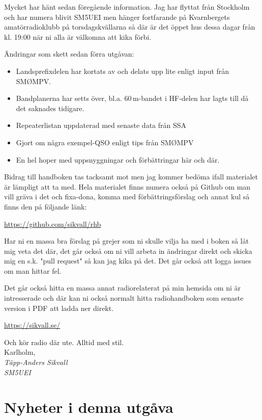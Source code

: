 Mycket har hänt sedan föregående information. Jag har flyttat från
Stockholm och har numera blivit SM5UEI men hänger fortfarande på
Kvarnbergets amatörradioklubb på torsdagskvällarna så där är det öppet
hus dessa dagar från kl. 19:00 när ni alla är välkomna att kika förbi.

Ändringar som skett sedan förra utgåvan:

\begin{itemize}[]
	\item Landsprefixdelen har kortats av och delats upp lite enligt 
	input från SMØMPV.
	\item Bandplanerna har setts över, bl.a. 60\,m-bandet i HF-delen 
	har lagts till då det saknades tidigare.
	\item Repeaterlistan uppdaterad med senaste data från SSA
	\item Gjort om några exempel-QSO enligt tips från SMØMPV
	\item En hel hoper med uppsnyggningar och förbättringar här och där.
\end{itemize}

Bidrag till handboken tas tacksamt mot men jag kommer bedöma ifall
materialet är lämpligt att ta med.  Hela materialet finns numera också
på Github om man vill gräva i det och fixa-dona, komma med 
förbättrings\-förslag och annat kul så finns den på följande länk:

\href{https://github.com/sikvall/rhb/}{https://github.com/sikvall/rhb}

Har ni en massa bra förslag på grejer som ni skulle vilja ha med i boken
så låt mig veta det där, det går också om ni vill arbeta in ändringar direkt
och skicka mig en s.k. "pull request" så kan jag kika på det. Det går också
att logga issues om man hittar fel.

Det går också hitta en massa annat radiorelaterat på min hemsida om ni 
är intresserade och där kan ni också normalt hitta radiohandboken som 
senaste version i PDF att ladda ner direkt.

\href{https://sikvall.se}{https://sikvall.se/}

Och kör radio där ute. Alltid med stil.\\[4em]

Karlholm, \DokumentDatum\\
\textit{Täpp-Anders Sikvall\\
	SM5UEI}

\clearpage

\section*{Nyheter i denna utgåva}

